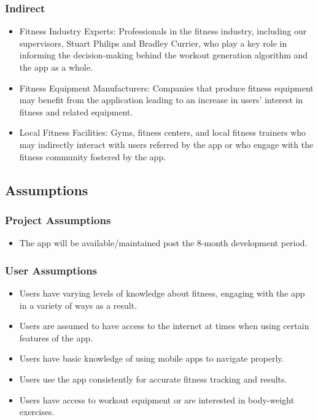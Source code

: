\documentclass[12pt]{article}
\begin{document}
\subsubsection{Indirect}
\begin{itemize}
  \item Fitness Industry Experts: Professionals in the fitness industry, including our supervisors, Stuart Philips and Bradley Currier, who play a key role in informing the decision-making behind the workout generation algorithm and the app as a whole.
  \item Fitness Equipment Manufacturers: Companies that produce fitness equipment may benefit from the application leading to an increase in users’ interest in fitness and related equipment.
  \item Local Fitness Facilities: Gyms, fitness centers, and local fitness trainers who may indirectly interact with users referred by the app or who engage with the fitness community fostered by the app.
\end{itemize}

\subsection{Assumptions}

\subsubsection{Project Assumptions}
\begin{itemize}
  \item The app will be available/maintained post the 8-month development period.
\end{itemize}

\subsubsection{User Assumptions}
\begin{itemize}
  \item Users have varying levels of knowledge about fitness, engaging with the app in a variety of ways as a result.
  \item Users are assumed to have access to the internet at times when using certain features of the app.
  \item Users have basic knowledge of using mobile apps to navigate properly.
  \item Users use the app consistently for accurate fitness tracking and results.
  \item Users have access to workout equipment or are interested in body-weight exercises. 
\end{itemize}
\end{document}
